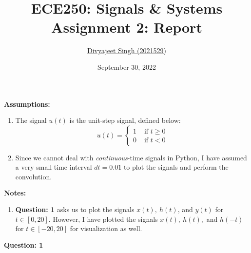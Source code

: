 \documentclass{article}
\title{
    \textbf{ECE250: Signals \& Systems} \\
    \large{Assignment 2: Report}
}
\author{\href{mailto:divyajeet21529@iiitd.ac.in}{Divyajeet Singh (2021529)}}
\date{September 30, 2022}
\begin{document}
    \maketitle

    \textbf{Assumptions:}

    \begin{enumerate}
        \item The signal $u(t)$ is the unit-step signal, defined below: \begin{equation}
            u(t) = \begin{cases}
                1 & \text{ if } t \geq 0 \\
                0 & \text{ if } t < 0
            \end{cases}
        \end{equation}

        \item Since we cannot deal with \textit{continuous}-time signals in Python, I
        have assumed a very small time interval $dt = 0.01$ to plot the signals and
        perform the convolution.
    \end{enumerate}
    \vspace{5mm}

    \textbf{Notes:}

    \begin{enumerate}
        \item
        \textbf{Question: 1} asks us to plot the signals $x(t),\ h(t)$, and $y(t)$ for
        $t \in [0, 20]$. However, I have plotted the signals $x(t),\ h(t),$ and $h(-t)$
        for $t \in [-20, 20]$ for visualization as well.
    \end{enumerate}
    \vspace{1cm}

    \textbf{Question: 1}
\end{document}
